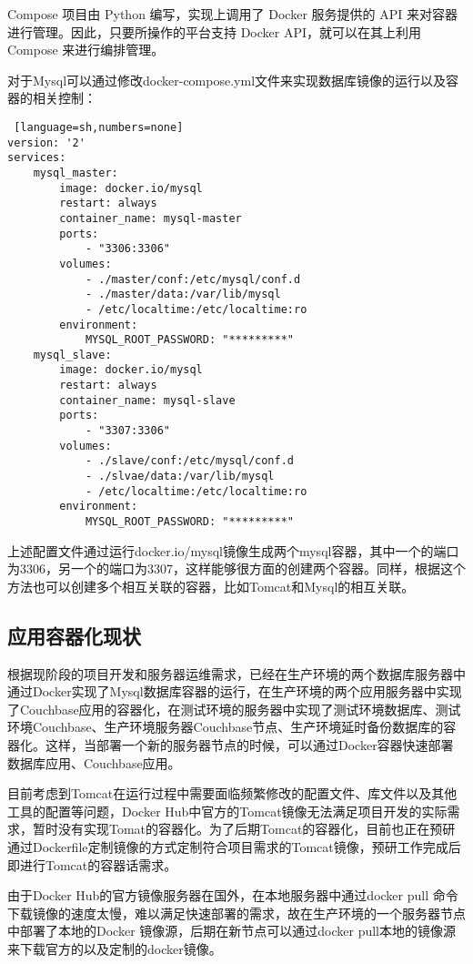 Compose 项目由 Python 编写，实现上调用了 Docker 服务提供的 API 来对容器进行管理。因此，只要所操作的平台支持 Docker API，就可以在其上利用 Compose 来进行编排管理。

对于Mysql可以通过修改docker-compose.yml文件来实现数据库镜像的运行以及容器的相关控制：
\begin{lstlisting} [language=sh,numbers=none]
version: '2'
services:
    mysql_master:
        image: docker.io/mysql
        restart: always
        container_name: mysql-master
        ports:
            - "3306:3306"
        volumes:
            - ./master/conf:/etc/mysql/conf.d
            - ./master/data:/var/lib/mysql
            - /etc/localtime:/etc/localtime:ro
        environment:
            MYSQL_ROOT_PASSWORD: "*********"
    mysql_slave:
        image: docker.io/mysql
        restart: always
        container_name: mysql-slave
        ports:
            - "3307:3306"
        volumes:
            - ./slave/conf:/etc/mysql/conf.d
            - ./slvae/data:/var/lib/mysql
            - /etc/localtime:/etc/localtime:ro
        environment:
            MYSQL_ROOT_PASSWORD: "*********"
\end{lstlisting}
上述配置文件通过运行docker.io/mysql镜像生成两个mysql容器，其中一个的端口为3306，另一个的端口为3307，这样能够很方面的创建两个容器。同样，根据这个方法也可以创建多个相互关联的容器，比如Tomcat和Mysql的相互关联。

\subsection{应用容器化现状}
根据现阶段的项目开发和服务器运维需求，已经在生产环境的两个数据库服务器中通过Docker实现了Mysql数据库容器的运行，在生产环境的两个应用服务器中实现了Couchbase应用的容器化，在测试环境的服务器中实现了测试环境数据库、测试环境Couchbase、生产环境服务器Couchbase节点、生产环境延时备份数据库的容器化。这样，当部署一个新的服务器节点的时候，可以通过Docker容器快速部署数据库应用、Couchbase应用。

目前考虑到Tomcat在运行过程中需要面临频繁修改的配置文件、库文件以及其他工具的配置等问题，Docker Hub中官方的Tomcat镜像无法满足项目开发的实际需求，暂时没有实现Tomat的容器化。为了后期Tomcat的容器化，目前也正在预研通过Dockerfile定制镜像的方式定制符合项目需求的Tomcat镜像，预研工作完成后即进行Tomcat的容器话需求。

由于Docker Hub的官方镜像服务器在国外，在本地服务器中通过docker pull 命令下载镜像的速度太慢，难以满足快速部署的需求，故在生产环境的一个服务器节点中部署了本地的Docker 镜像源，后期在新节点可以通过docker pull本地的镜像源来下载官方的以及定制的docker镜像。


